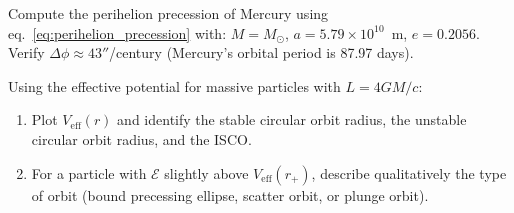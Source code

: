 \begin{exercise}
\label{ex:mercury_precession}
Compute the perihelion precession of Mercury using
eq.~\eqref{eq:perihelion_precession} with:
$M = M_\odot$, $a = 5.79 \times 10^{10}$~m, $e = 0.2056$.
Verify $\Delta\phi \approx 43''$/century (Mercury's orbital period is
87.97 days).
\end{exercise}

\begin{exercise}
\label{ex:orbit_integration}
Using the effective potential for massive particles with $L = 4GM/c$:
\begin{enumerate}[label=(\alph*)]
    \item Plot $V_{\mathrm{eff}}(r)$ and identify the stable circular
          orbit radius, the unstable circular orbit radius, and the
          ISCO.
    \item For a particle with $\mathcal{E}$ slightly above
          $V_{\mathrm{eff}}(r_+)$, describe qualitatively the type of
          orbit (bound precessing ellipse, scatter orbit, or plunge orbit).
\end{enumerate}
\end{exercise}
